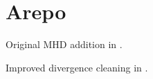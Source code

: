 \section{Arepo}

Original MHD addition in \cite{Pakmor2011}.

Improved divergence cleaning in \cite{Pakmor2013}.
